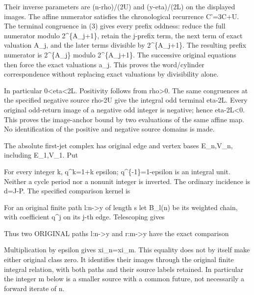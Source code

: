 
Their inverse parameters are (n-rho)/(2U) and (y-eta)/(2L) on the
displayed images. The affine numerator satisfies the chronological
recurrence C'=3C+U. The terminal congruence in (3) gives every prefix
oddness: reduce the full numerator modulo 2\^{}\{A\_j+1\}, retain the
j-prefix term, the next term of exact valuation A\_j, and the later
terms divisible by 2\^{}\{A\_j+1\}. The resulting prefix numerator is
2\^{}\{A\_j\} modulo 2\^{}\{A\_j+1\}. The successive original equations
then force the exact valuations a\_j. This proves the word/cylinder
correspondence without replacing exact valuations by divisibility alone.

In particular 0\textless eta\textless2L. Positivity follows from
rho\textgreater0. The same congruences at the specified negative source
rho-2U give the integral odd terminal eta-2L. Every original odd-return
image of a negative odd integer is negative; hence eta-2L\textless0.
This proves the image-anchor bound by two evaluations of the same affine
map. No identification of the positive and negative source domains is
made.

The absolute first-jet complex has original edge and vertex bases
E\_n,V\_n, including E\_1,V\_1. Put


For every integer k, q\^{}k=1+k epsilon; q\^{}\{-1\}=1-epsilon is an
integral unit. Neither a cycle period nor a nonunit integer is inverted.
The ordinary incidence is d=J-P. The specified comparison kernel is


For an original finite path l:n-\textgreater y of length s let B\_l(n)
be its weighted chain, with coefficient q\^{}j on its j-th edge.
Telescoping gives


Thus two ORIGINAL paths l:n-\textgreater y and r:m-\textgreater y have
the exact comparison


Multiplication by epsilon gives xi\_n=xi\_m. This equality does not by
itself make either original class zero. It identifies their images
through the original finite integral relation, with both paths and their
source labels retained. In particular the integer m below is a smaller
source with a common future, not necessarily a forward iterate of n.

